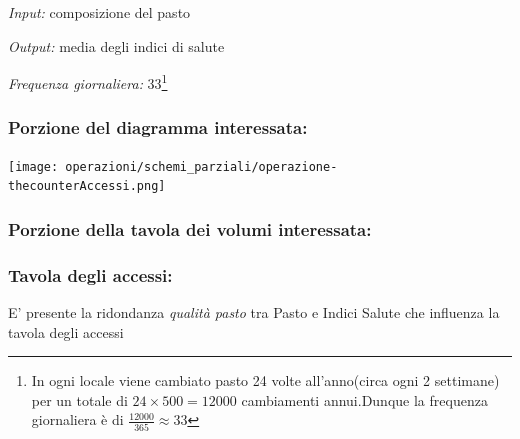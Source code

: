 \documentclass[12pt,a4paper]{article}
\begin{document}
\noindent\textit{Input:} composizione del pasto

\noindent\textit{Output:} media degli indici di salute

\noindent\textit{Frequenza giornaliera:} 33\footnote{In ogni locale viene cambiato pasto 24 volte all'anno(circa ogni 2 settimane) per un totale di $24\times 500 = 12000$ cambiamenti annui.Dunque la frequenza giornaliera è di $\frac{12000}{365}\approx 33$}

\subsubsection*{Porzione del diagramma interessata:}

\texttt{[image: operazioni/schemi\_parziali/operazione-\\thecounterAccessi.png]} 
\subsubsection*{Porzione della tavola dei volumi interessata:}
\subsubsection*{Tavola degli accessi:}

E' presente la ridondanza \textit{qualità pasto} tra Pasto e Indici Salute che influenza la tavola degli accessi
\end{document}
